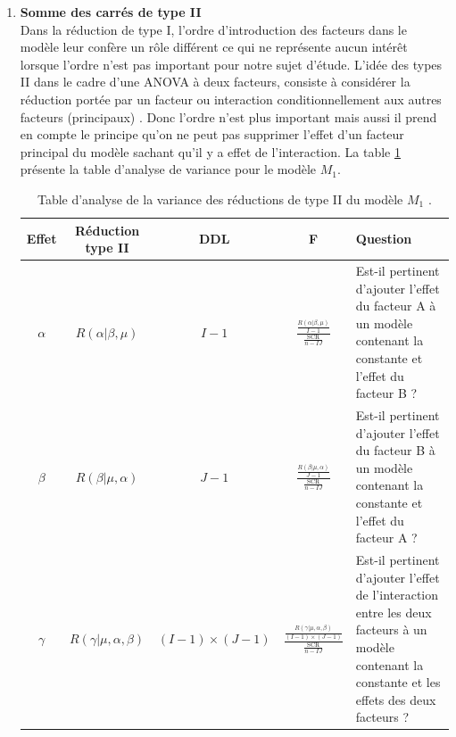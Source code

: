 \documentclass[12pt,a4paper]{article}
\begin{document}
\begin{enumerate}[label=\textbf{\alph*})]
		\item \textbf{Somme des carrés de type II}\\
		Dans la réduction de type I, l'ordre d'introduction des facteurs dans le modèle leur confère un rôle différent ce qui ne représente aucun intérêt lorsque l'ordre n'est pas important pour notre sujet d'étude. L'idée des types II dans le cadre d'une ANOVA à deux facteurs, consiste à considérer la réduction portée par un facteur ou interaction conditionnellement aux autres facteurs (principaux) \cite{navarro2021}. Donc l'ordre n'est plus important mais aussi il prend en compte le principe qu'on ne peut pas supprimer l'effet d'un facteur principal du modèle sachant qu'il y a effet de l'interaction.
		La table \ref{ref:analyse_var_2} présente la table d'analyse de variance pour le modèle $M_1$.
		\begin{table}[H]
			\centering
			\caption{Table d'analyse de la variance des réductions de type II du modèle $M_1$ \cite{daudin}.}
			\begin{tabular}{|c|c|c|c|p{6cm}|}
				\hline
				\textbf{Effet} & \textbf{Réduction type II} & \textbf{DDL} & \textbf{F} & \textbf{Question} \\
				\hline
				$\alpha$ & $R(\alpha|\beta, \mu)$ & $I-1$ & \LARGE{$\frac{\frac{R(\alpha|\beta, \mu)}{I-1}}{\frac{\text{SCR}}{n - IJ}}$} & Est-il pertinent d'ajouter l'effet du facteur A à un modèle contenant la constante et l'effet du facteur B ? \\
				\hline
				$\beta$ & $R(\beta|\mu, \alpha)$ & $J-1$ & \LARGE{$\frac{\frac{R(\beta|\mu, \alpha)}{J-1}}{\frac{\text{SCR}}{n - IJ}}$} & Est-il pertinent d'ajouter l'effet du facteur B à un modèle contenant la constante et l'effet du facteur A ? \\
				\hline
				$\gamma$ & $R(\gamma|\mu, \alpha, \beta)$ & $(I-1) \times (J-1)$ & \LARGE{$\frac{\frac{R(\gamma|\mu, \alpha, \beta)}{(I-1) \times (J-1)}}{\frac{\text{SCR}}{n - IJ}}$} & Est-il pertinent d'ajouter l'effet de l'interaction entre les deux facteurs à un modèle contenant la constante et les effets des deux facteurs ? \\
				\hline
			\end{tabular}
		\label{ref:analyse_var_2}
		\end{table}
		

\end{enumerate}
\end{document}
